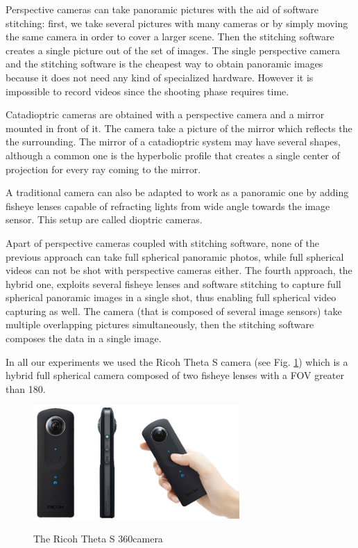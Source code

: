 Perspective cameras can take panoramic pictures with the aid of 
software stitching: first, we take several pictures with many cameras or by
simply moving 
the same camera in order to cover a larger scene. Then the stitching software 
creates a single picture out of the set of images.
The single perspective camera and the stitching software is the cheapest 
way to obtain panoramic images because it does not need any kind of specialized 
hardware. However it is impossible to record videos since the shooting phase 
requires time.

Catadioptric cameras are obtained with a perspective camera and a mirror 
mounted in front of it. 
The camera take a picture of the mirror which reflects the the 
surrounding. The mirror of a catadioptric system may have several shapes, 
although a common one is the hyperbolic profile that creates a single center of 
projection for every ray coming to the mirror.

A traditional camera can also be adapted to work as a panoramic one by adding
fisheye lenses capable of refracting lights from wide angle towards the 
image sensor. This setup are called dioptric cameras.

Apart of perspective cameras coupled with stitching software, none of the 
previous approach can take full spherical panoramic photos, while full spherical 
videos can not be shot with perspective cameras either.
The fourth approach, the hybrid one, exploits several fisheye lenses and 
software stitching to capture full spherical panoramic images in a single shot, 
thus enabling full spherical video capturing as well.
The camera (that is composed of several image sensors) take multiple 
overlapping pictures simultaneously, then the stitching software composes the
data in a single image.

In all our experiments we used the Ricoh Theta S camera 
(see Fig. \ref{fig:ricoh_theta}) which is a hybrid full spherical camera 
composed of two fisheye lenses with a FOV greater than 180\degree.
\begin{figure}
\centering
\includegraphics[width=0.7\textwidth]{img/theta_s}
\label{fig:ricoh_theta}
\caption{The Ricoh Theta S 360\degree camera}
\end{figure}

